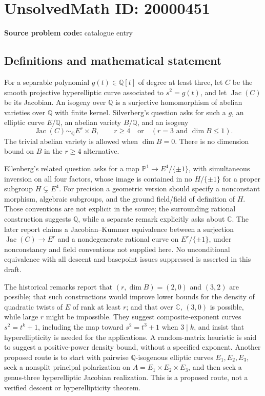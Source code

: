 \documentclass[11pt]{article}
\newcommand{\Q}{\mathbb{Q}}
\newcommand{\C}{\mathbb{C}}
\newcommand{\PP}{\mathbb{P}}
\begin{document}
\section*{UnsolvedMath ID: 20000451}
\textbf{Source problem code:} catalogue entry
\subsection{Definitions and mathematical statement}
For a separable polynomial \(g(t)\in\Q[t]\) of degree at least three, let \(C\) be the smooth projective hyperelliptic curve associated to \(s^2=g(t)\), and let \(\operatorname{Jac}(C)\) be its Jacobian. An isogeny over \(\Q\) is a surjective homomorphism of abelian varieties over \(\Q\) with finite kernel. Silverberg's question asks for such a \(g\), an elliptic curve \(E/\Q\), an abelian variety \(B/\Q\), and an isogeny
\[
 \operatorname{Jac}(C)\sim_{\Q}E^r\times B,
 \qquad r\ge4\quad\text{or}\quad(r=3\text{ and }\dim B\le1).
\]
The trivial abelian variety is allowed when \(\dim B=0\). There is no dimension bound on \(B\) in the \(r\ge4\) alternative.

Ellenberg's related question asks for a map \(\PP^1\to E^4/\{\pm1\}\), with simultaneous inversion on all four factors, whose image is contained in no \(H/\{\pm1\}\) for a proper subgroup \(H\subsetneq E^4\). For precision a geometric version should specify a nonconstant morphism, algebraic subgroups, and the ground field/field of definition of \(H\). Those conventions are not explicit in the source; the surrounding rational construction suggests \(\Q\), while a separate remark explicitly asks about \(\C\). The later report claims a Jacobian--Kummer equivalence between a surjection \(\operatorname{Jac}(C)\to E^r\) and a nondegenerate rational curve on \(E^r/\{\pm1\}\), under nonconstancy and field conventions not supplied here. No unconditional equivalence with all descent and basepoint issues suppressed is asserted in this draft.

The historical remarks report that \((r,\dim B)=(2,0)\) and \((3,2)\) are possible; that such constructions would improve lower bounds for the density of quadratic twists of \(E\) of rank at least \(r\); and that over \(\C\), \((3,0)\) is possible, while large \(r\) might be impossible. They suggest composite-exponent curves \(s^2=t^k+1\), including the map toward \(s^2=t^3+1\) when \(3\mid k\), and insist that hyperellipticity is needed for the applications. A random-matrix heuristic is said to suggest a positive-power density bound, without a specified exponent. Another proposed route is to start with pairwise \(\Q\)-isogenous elliptic curves \(E_1,E_2,E_3\), seek a nonsplit principal polarization on \(A=E_1\times E_2\times E_3\), and then seek a genus-three hyperelliptic Jacobian realization. This is a proposed route, not a verified descent or hyperellipticity theorem.
\end{document}
